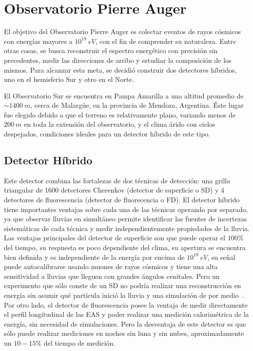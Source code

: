 \chapter{Observatorio Pierre Auger}
\label{ch:detectorAuger}

El objetivo del Observatorio Pierre Auger es colectar eventos de rayos c\'osmicos con energ\'ias mayores a $10^{18}\ eV$, con el fin de comprender su naturaleza. Entre otras cosas, se busca reconstruir el espectro energ\'etico con precisi\'on sin precedentes, medir las direcciones de arribo y estudiar la composici\'on de los mismos.
Para alcanzar esta meta, se decidi\'o construir dos detectores h\'ibridos, uno en el hemisferio Sur y otro en el Norte.

El Observatorio Sur se encuentra en Pampa Amarilla a una altitud promedio de $\sim 1400\ m$, cerca de Malarg\"ue, en la provincia de Mendoza, Argentina.
\'Este lugar fue elegido debido a que el terreno es relativamente plano, variando menos de $200\ m$ en toda la extensi\'on del observatorio, y el clima \'arido con cielos despejados, condiciones ideales para un detector h\'ibrido de este tipo.

	\section{Detector H\'ibrido}
	Este detector combina las fortalezas de dos t\'ecnicas de detecci\'on: una grilla triangular de 1600 detectores Cherenkov (detector de superficie o SD) y 4 detectores de fluorescencia (detector de fluorecencia o FD).
	El detector h\'ibrido tiene importantes ventajas sobre cada una de las t\'ecnicas operando por separado, ya que observar lluvias en simult\'aneo permite identificar las fuentes de incertezas sistem\'aticas de cada t\'ecnica y medir independientemente propiedades de la lluvia.
	Las ventajas principales del detector de superficie son que puede operar el $100 \%$ del tiempo, su respuesta es poco dependiente del clima, su apertura se encuentra bien definida y es independiente de la energ\'ia por encima de $10^{19}\ eV$, su se\~nal puede autocalibrarse usando muones de rayos c\'osmicos  y tiene una alta sensitividad a lluvias que lleguen con grandes \'angulos cenitales. 
	Pero un experimento que s\'olo conste de un SD no podr\'ia realizar una reconstrucci\'on en energ\'ia sin asumir qu\'e part\'icula inici\'o la lluvia y una simulaci\'on de por medio~\cite{busca_thesis}.
	Por otro lado, el detector de fluorescencia posee la ventaja de medir directamente el perfil longitudinal de las EAS y poder realizar una medici\'on calorim\'etrica de la energ\'ia, sin necesidad de simulaciones. Pero la desventaja de este detector es que s\'olo puede realizar mediciones en noches sin luna y sin nubes, aproximadamente un $10 - 15 \%$ del tiempo de medici\'on.
	
